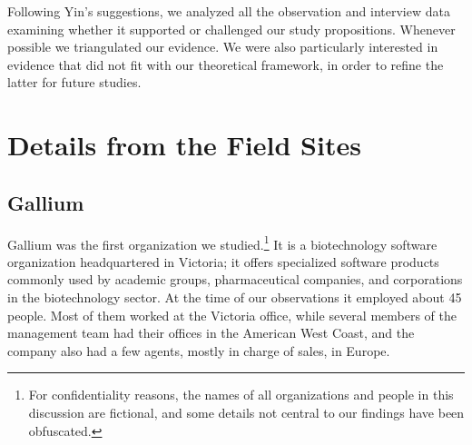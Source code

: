 \documentclass[10pt, conference, compsocconf]{IEEEtran}
\begin{document}
Following Yin's \cite{Yin2003} suggestions, we analyzed all the observation and interview data examining whether it supported or challenged our study propositions. Whenever possible we triangulated our evidence. We were also particularly interested in evidence that did not fit with our theoretical framework, in order to refine the latter for future studies.




\section{Details from the Field Sites}

\subsection{Gallium}

Gallium was the first organization we studied.\footnote{For confidentiality reasons, the names of all organizations and people in this discussion are fictional, and some details not central to our findings have been obfuscated.} It is a biotechnology software organization headquartered in Victoria; it offers specialized software products commonly used by academic groups, pharmaceutical companies, and corporations in the biotechnology sector. At the time of our observations it employed about 45 people. Most of them worked at the Victoria office, while several members of the management team had their offices in the American West Coast, and the company also had a few agents, mostly in charge of sales, in Europe.
\end{document}
